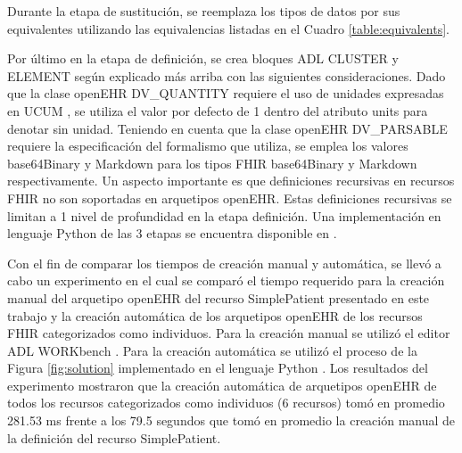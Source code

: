 Durante la etapa de sustitución, se reemplaza los tipos de datos por sus equivalentes utilizando las equivalencias listadas en el Cuadro \ref{table:equivalents}.

Por último en la etapa de definición, se crea bloques ADL CLUSTER y ELEMENT según explicado más arriba con las siguientes consideraciones. Dado que la clase openEHR DV\_QUANTITY requiere el uso de unidades expresadas en UCUM \cite{UCUM}, se utiliza el valor por defecto de 1 dentro del atributo units para denotar sin unidad. Teniendo en cuenta que la clase openEHR DV\_PARSABLE requiere la especificación del formalismo que utiliza, se emplea los valores base64Binary y Markdown para los tipos FHIR base64Binary y Markdown respectivamente. Un aspecto importante es que definiciones recursivas en recursos FHIR no son soportadas en arquetipos openEHR. Estas definiciones recursivas se limitan a 1 nivel de profundidad en la etapa definición. Una implementación en lenguaje Python de las 3 etapas se encuentra disponible en \cite{PythonImplementation}.

Con el fin de comparar los tiempos de creación manual y automática, se llevó a cabo un experimento en el cual se comparó el tiempo requerido para la creación manual del arquetipo openEHR del recurso SimplePatient presentado en este trabajo  y la creación automática de los arquetipos openEHR de los recursos FHIR categorizados como individuos. Para la creación manual se utilizó el editor ADL WORKbench \cite{ADLWORKbench}. Para la creación automática se utilizó el proceso de la Figura \ref{fig:solution} implementado en el lenguaje Python \cite{PythonImplementation}. Los resultados del experimento mostraron que la creación automática de arquetipos openEHR de todos los recursos categorizados como individuos (6 recursos) tomó en promedio 281.53 ms frente a los 79.5 segundos que tomó en promedio la creación manual de la definición del recurso SimplePatient.
